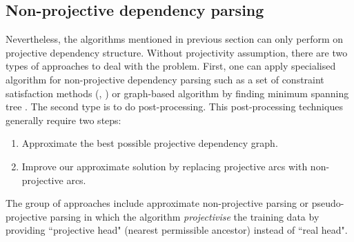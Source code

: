 \documentclass[12pt]{article}
\begin{document}
\subsection{Non-projective dependency parsing}
Nevertheless, the algorithms mentioned in previous section can only perform on projective dependency structure. Without projectivity assumption, there are two types of approaches to deal with the problem. First, one can apply specialised algorithm for non-projective dependency parsing such as a set of constraint satisfaction methods (\cite{duchier2001topological}, \cite{foth2004broad}) or graph-based algorithm by finding minimum spanning tree \cite{mcdonald2005non}. The second type is to do post-processing. This post-processing techniques generally require two steps:
\begin{enumerate}
	\item Approximate the best possible projective dependency graph.
	\item Improve our approximate solution by replacing projective arcs with non-projective arcs.
\end{enumerate}

The group of approaches include approximate non-projective parsing \cite{mcdonald2006online} or pseudo-projective parsing \cite{nivre2006labeled} in which the algorithm \textit{projectivise} the training data by providing ``projective head" (nearest permissible ancestor) instead of ``real head".

{}

\end{document}
